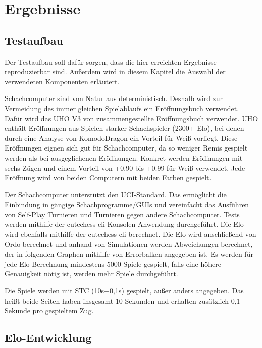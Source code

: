 \chapter{Ergebnisse}
\label{chap:Ergebnisse}

\section{Testaufbau}

Der Testaufbau soll dafür sorgen, dass die hier erreichten Ergebnisse reproduzierbar sind. Außerdem wird in diesem Kapitel die Auswahl der verwendeten Komponenten erläutert.

Schachcomputer sind von Natur aus deterministisch. Deshalb wird zur Vermeidung des immer gleichen Spielablaufs ein Eröffnungsbuch verwendet. Dafür wird das \ac{UHO} V3 von \citeauthor{Pohl2021} \cite{Pohl2021} zusammengestellte Eröffnungsbuch verwendet. \ac{UHO} enthält Eröffnungen aus Spielen starker Schachspieler (2300+ Elo), bei denen durch eine Analyse von KomodoDragon \cite{KomodoDragon} ein Vorteil für Weiß vorliegt. Diese Eröffnungen eignen sich gut für Schachcomputer, da so weniger Remis gespielt werden als bei ausgeglichenen Eröffnungen. Konkret werden Eröffnungen mit sechs Zügen und einem Vorteil von +0.90 bis +0.99 für Weiß verwendet. Jede Eröffnung wird von beiden Computern mit beiden Farben gespielt.

Der Schachcomputer unterstützt den \ac{UCI}-Standard. Das ermöglicht die Einbindung in gängige Schachprogramme/GUIs und vereinfacht das Ausführen von Self-Play Turnieren und Turnieren gegen andere Schachcomputer. Tests werden mithilfe der cutechess-cli \cite{CutechessRepo} Konsolen-Anwendung durchgeführt. Die Elo wird ebenfalls mithilfe der cutechess-cli berechnet. Die Elo wird anschließend von Ordo \cite{OrdoRepo} berechnet und anhand von Simulationen werden Abweichungen berechnet, der in folgenden Graphen mithilfe von Errorbalken angegeben ist. Es werden für jede Elo Berechnung mindestens 5000 Spiele gespielt, falls eine höhere Genauigkeit nötig ist, werden mehr Spiele durchgeführt.

Die Spiele werden mit \ac{STC} (10s+0,1s) gespielt, außer anders angegeben. Das heißt beide Seiten haben insgesamt 10 Sekunden und erhalten zusätzlich 0,1 Sekunde pro gespieltem Zug.

\section{Elo-Entwicklung}

